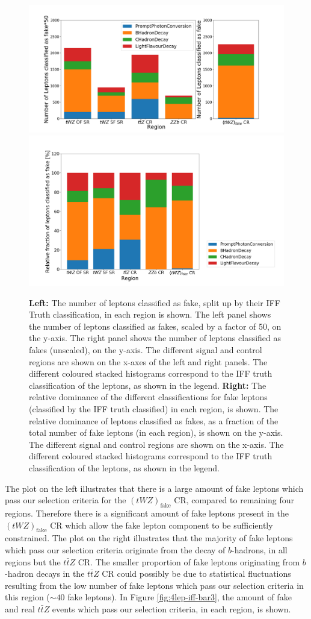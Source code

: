 \begin{figure}[htbp]
\centering

    \includegraphics[width=.47\textwidth]{figures/iff_bar_1.png}   
     \includegraphics[width=.47\textwidth]{figures/iff_bar_2.png} 

    \caption{\textbf{Left: }The number of leptons classified as fake, split up by their IFF Truth classification, in each region is shown. The left panel shows the number of leptons classified as fakes, scaled by a factor of 50, on the y-axis. The right panel shows the number of leptons classified as fakes (unscaled), on the y-axis. The different signal and control regions are shown on the x-axes of the left and right panels. The different coloured stacked histograms correspond to the IFF truth classification of the leptons, as shown in the legend. \textbf{Right: }The relative dominance of the different classifications for fake leptons (classified by the IFF truth classified) in each region, is shown. The relative dominance of leptons classified as fakes, as a fraction of the total number of fake leptons (in each region), is shown on the y-axis. The different signal and control regions are shown on the x-axis. The different coloured stacked histograms correspond to the IFF truth classification of the leptons, as shown in the legend.}
  \label{fig:4lep-iff-bar1}
\end{figure}The plot on the left illustrates that there is a large amount of fake leptons which pass our selection criteria for the $(tWZ)_{\text{fake}}$ CR, compared to remaining four regions. Therefore there is a significant amount of fake leptons present in the $(tWZ)_{\text{fake}}$ CR which allow the fake lepton component to be sufficiently constrained. The plot on the right illustrates that the majority of fake leptons which pass our selection criteria originate from the decay of $b$-hadrons, in all regions but the $t\bar{t}Z$ CR. The smaller proportion of fake leptons originating from $b$-hadron decays in the $t\bar{t}Z$ CR could possibly be due to statistical fluctuations resulting from the low number of fake leptons which pass our selection criteria in this region ($\sim 40$ fake leptons). In Figure \ref{fig:4lep-iff-bar3}, the amount of fake and real $t\bar{t}Z$ events which pass our selection criteria, in each region, is shown.


